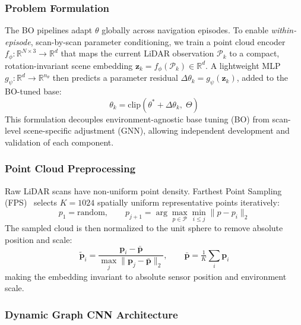 \documentclass[conference]{IEEEtran}
\begin{document}
\subsubsection{Problem Formulation}

The BO pipelines adapt $\theta$ globally across navigation episodes. To enable \emph{within-episode}, scan-by-scan parameter conditioning, we train a point cloud encoder $f_\phi: \mathbb{R}^{N \times 3} \to \mathbb{R}^d$ that maps the current LiDAR observation $\mathcal{P}_k$ to a compact, rotation-invariant scene embedding $\mathbf{z}_k = f_\phi(\mathcal{P}_k) \in \mathbb{R}^d$. A lightweight MLP $g_\psi: \mathbb{R}^d \to \mathbb{R}^{n_\theta}$ then predicts a parameter residual $\Delta\theta_k = g_\psi(\mathbf{z}_k)$, added to the BO-tuned base:
\begin{equation}
	\theta_k = \text{clip}(\theta^* + \Delta\theta_k,\; \Theta)
	\label{eq:gnn-cond}
\end{equation}
This formulation decouples environment-agnostic base tuning (BO) from scan-level scene-specific adjustment (GNN), allowing independent development and validation of each component.

\subsubsection{Point Cloud Preprocessing}

Raw LiDAR scans have non-uniform point density. Farthest Point Sampling (FPS)~\cite{@TODO} selects $K = 1024$ spatially uniform representative points iteratively:
\begin{equation}
	p_1 = \text{random}, \qquad p_{j+1} = \arg\max_{p \in \mathcal{P}} \min_{i \le j} \|p - p_i\|_2
	\label{eq:fps}
\end{equation}
The sampled cloud is then normalized to the unit sphere to remove absolute position and scale:
\begin{equation}
	\tilde{\mathbf{p}}_i = \frac{\mathbf{p}_i - \bar{\mathbf{p}}}{\max_j \|\mathbf{p}_j - \bar{\mathbf{p}}\|_2}, \qquad \bar{\mathbf{p}} = \tfrac{1}{K}\textstyle\sum_i \mathbf{p}_i
	\label{eq:norm}
\end{equation}
making the embedding invariant to absolute sensor position and environment scale.

\subsubsection{Dynamic Graph CNN Architecture}
\end{document}
